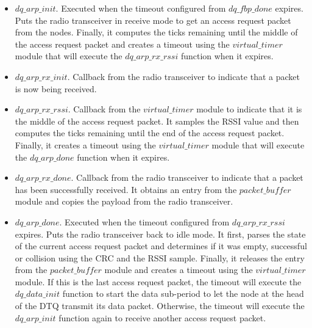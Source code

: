 \begin{itemize}
\item $dq\_arp\_init$. Executed when the timeout configured from $dq\_fbp\_done$ expires. Puts the radio transceiver in receive mode to get an access request packet from the nodes. Finally, it computes the ticks remaining until the middle of the access request packet and creates a timeout using the $virtual\_timer$ module that will execute the $dq\_arp\_rx\_rssi$ function when it expires.
\item $dq\_arp\_rx\_init$. Callback from the radio transceiver to indicate that a packet is now being received.
\item $dq\_arp\_rx\_rssi$. Callback from the $virtual\_timer$ module to indicate that it is the middle of the access request packet. It samples the RSSI value and then computes the ticks remaining until the end of the access request packet. Finally, it creates a timeout using the $virtual\_timer$ module that will execute the $dq\_arp\_done$ function when it expires.
\item $dq\_arp\_rx\_done$. Callback from the radio transceiver to indicate that a packet has been successfully received. It obtains an entry from the $packet\_buffer$ module and copies the payload from the radio transceiver.
\item $dq\_arp\_done$. Executed when the timeout configured from $dq\_arp\_rx\_rssi$ expires. Puts the radio transceiver back to idle mode. It first, parses the state of the current access request packet and determines if it was empty, successful or collision using the CRC and the RSSI sample. Finally, it releases the entry from the $packet\_buffer$ module and creates a timeout using the $virtual\_timer$ module. If this is the last access request packet, the timeout will execute the $dq\_data\_init$ function to start the data sub-period to let the node at the head of the DTQ transmit its data packet. Otherwise, the timeout will execute the $dq\_arp\_init$ function again to receive another access request packet.


\end{itemize}
